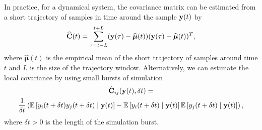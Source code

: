 
In practice, for a dynamical system, the covariance matrix can be estimated from a short trajectory of samples in time around the sample $\mathbf{y}(t)$ by
\begin{equation} \label{eq:cov1}
	\widehat{\mathbf{C}}(t) = \sum \limits _{\tau = t-L}^{t+L} (\mathbf{y}(\tau) - \widehat{\boldsymbol{\mu}}(t))(\mathbf{y}(\tau) - \widehat{\boldsymbol{\mu}}(t))^T,
\end{equation}
where $\widehat{\boldsymbol{\mu}}(t)$ is the empirical mean of the short trajectory of samples around time $t$ and $L$ is the size of the trajectory window.
%
Alternatively, we can estimate the local covariance by using small bursts of simulation 
\begin{multline} \label{eq:cov2}
\hat{\mathbf{C}}_{ij}(\mathbf{y}(t), \delta t)
= \\
\frac{1}{ \delta t} \left( \mathbb{E} \left[ y_i (t+\delta t) y_j (t+ \delta t) \mid \mathbf{y}(t) \right]
- \mathbb{E} \left[ y_i (t+\delta t) \mid \mathbf{y}(t) \right] \mathbb{E} \left[ y_j (t+\delta t) \mid \mathbf{y}(t) \right] \right) ,
\end{multline}
%
where $\delta t > 0$ is the length of the simulation burst.
%

